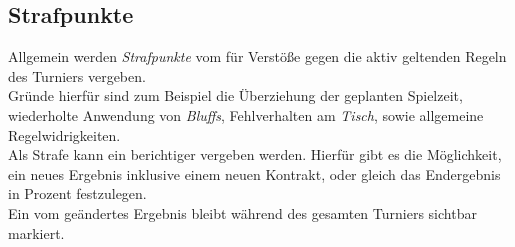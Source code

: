 \subsection{Strafpunkte}

\noindent
Allgemein werden \textit{Strafpunkte} vom \tl für Verstöße gegen die aktiv
geltenden Regeln des Turniers vergeben.\\[.1cm]
Gründe hierfür sind zum Beispiel die Überziehung der geplanten Spielzeit,
wiederholte Anwendung von \textit{Bluffs}, Fehlverhalten am \textit{Tisch},
sowie allgemeine Regelwidrigkeiten.\\[.1cm]
Als Strafe kann ein berichtiger \scy vergeben werden. Hierfür gibt es die
Möglichkeit, ein neues Ergebnis inklusive einem neuen Kontrakt, oder gleich das
Endergebnis in Prozent festzulegen.\\[.1cm]
Ein vom \tl geändertes Ergebnis bleibt während des gesamten Turniers sichtbar
markiert.
